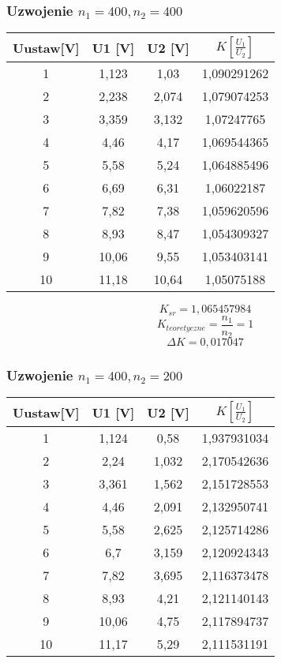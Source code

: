 \documentclass[polish,a4paper]{article}
\begin{document}
\subsubsection{Uzwojenie $n_1 = 400, n_2 = 400$}
\begin{table}[H]
\centering
\begin{tabular}{|c|c|c|c|}
\hline
Uustaw[V] &  U1 [V] &  U2 [V] &  $K[\frac{U_1}{U_2}]$ \\
\hline
1 &  1,123 &  1,03 &  1,090291262 \\
2 &  2,238 &  2,074 &  1,079074253 \\
3 &  3,359 &  3,132 &  1,07247765 \\
4 &  4,46 &  4,17 &  1,069544365 \\
5 &  5,58 &  5,24 &  1,064885496 \\
6 &  6,69 &  6,31 &  1,06022187 \\
7 &  7,82 &  7,38 &  1,059620596 \\
8 &  8,93 &  8,47 &  1,054309327 \\
9 &  10,06 &  9,55 &  1,053403141 \\
10 &  11,18 &  10,64 &  1,05075188 \\
\hline
\end{tabular}
\end{table}

$$K_{sr} = 1,065457984$$
$$K_{teoretyczne} = \frac{n_1}{n_2} = 1$$
$$\Delta K = 0,017047$$

\subsubsection{Uzwojenie $n_1 = 400, n_2 = 200$}
\begin{table}[H]
\centering
\begin{tabular}{|c|c|c|c|}
\hline
Uustaw[V] &  U1 [V] &  U2 [V] &  $K[\frac{U_1}{U_2}]$ \\
\hline
1 &  1,124 &  0,58 &  1,937931034 \\
2 &  2,24 &  1,032 &  2,170542636 \\
3 &  3,361 &  1,562 &  2,151728553 \\
4 &  4,46 &  2,091 &  2,132950741 \\
5 &  5,58 &  2,625 &  2,125714286 \\
6 &  6,7 &  3,159 &  2,120924343 \\
7 &  7,82 &  3,695 &  2,116373478 \\
8 &  8,93 &  4,21 &  2,121140143 \\
9 &  10,06 &  4,75 &  2,117894737 \\
10 &  11,17 &  5,29 &  2,111531191 \\
\hline
\end{tabular}
\end{table}
\end{document}
